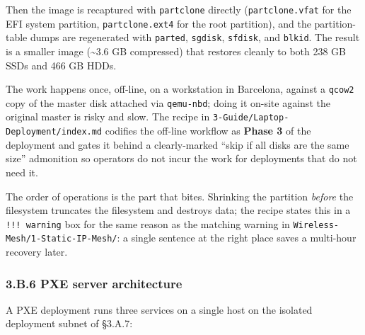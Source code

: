 Then the image is recaptured with \texttt{partclone} directly
(\texttt{partclone.vfat} for the EFI system partition,
\texttt{partclone.ext4} for the root partition), and the partition-table
dumps are regenerated with \texttt{parted}, \texttt{sgdisk},
\texttt{sfdisk}, and \texttt{blkid}. The result is a smaller image
(\textasciitilde3.6 GB compressed) that restores cleanly to both 238 GB
SSDs and 466 GB HDDs.

The work happens once, off-line, on a workstation in Barcelona, against
a \texttt{qcow2} copy of the master disk attached via \texttt{qemu-nbd};
doing it on-site against the original master is risky and slow. The
recipe in \texttt{3-Guide/Laptop-Deployment/index.md} codifies the
off-line workflow as \textbf{Phase 3} of the deployment and gates it
behind a clearly-marked ``skip if all disks are the same size''
admonition so operators do not incur the work for deployments that do
not need it.

The order of operations is the part that bites. Shrinking the partition
\emph{before} the filesystem truncates the filesystem and destroys data;
the recipe states this in a \texttt{!!!\ warning} box for the same
reason as the matching warning in
\texttt{Wireless-Mesh/1-Static-IP-Mesh/}: a single sentence at the right
place saves a multi-hour recovery later.

\hypertarget{b.6-pxe-server-architecture}{%
\subsubsection{3.B.6 PXE server
architecture}\label{b.6-pxe-server-architecture}}

A PXE deployment runs three services on a single host on the isolated
deployment subnet of §3.A.7:

